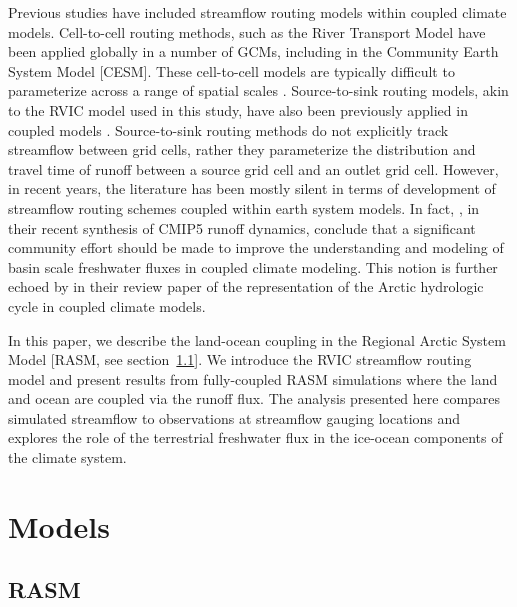 \documentclass[jgrga, draft]{agutex}
\begin{document}
\begin{article}
Previous studies have included streamflow routing models within coupled climate models.
Cell-to-cell routing methods, such as the River Transport Model \citep[RTM][]{Branstetter_2003} have been applied globally in a number of GCMs, including in the Community Earth System Model [CESM].
These cell-to-cell models are typically difficult to parameterize across a range of spatial scales \citep{Sushama_2004}.
Source-to-sink routing models, akin to the RVIC model used in this study, have also been previously applied in coupled models \citep[e.g.][]{Olivera_2000}.
Source-to-sink routing methods do not explicitly track streamflow between grid cells, rather they parameterize the distribution and travel time of runoff between a source grid cell and an outlet grid cell.
However, in recent years, the literature has been mostly silent in terms of development of streamflow routing schemes coupled within earth system models.
In fact, \citet{Bring_2015}, in their recent synthesis of CMIP5 runoff dynamics, conclude that a significant community effort should be made to improve the understanding and modeling of basin scale freshwater fluxes in coupled climate modeling.
This notion is further echoed by \citet{Lique_2015} in their review paper of the representation of the Arctic hydrologic cycle in coupled climate models.

In this paper, we describe the land-ocean coupling in the Regional Arctic System Model [RASM, see section~\ref{sec:rasm}].
We introduce the RVIC streamflow routing model and present results from fully-coupled RASM simulations where the land and ocean are coupled via the runoff flux.
The analysis presented here compares simulated streamflow to observations at streamflow gauging locations and explores the role of the terrestrial freshwater flux in the ice-ocean components of the climate system.

\section{Models}

\subsection{RASM}
\label{sec:rasm}


\end{article}
\end{document}
